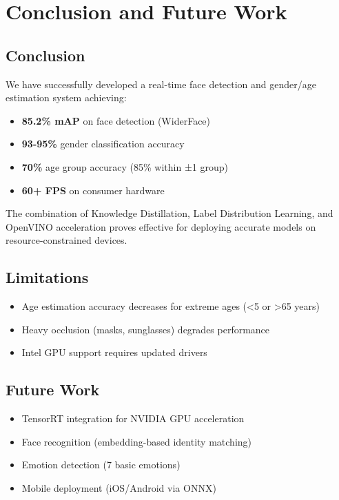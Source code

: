 \documentclass[12pt,a4paper]{article}
\begin{document}
\section{Conclusion and Future Work}

\subsection{Conclusion}

We have successfully developed a real-time face detection and gender/age estimation system achieving:

\begin{itemize}
    \item \textbf{85.2\% mAP} on face detection (WiderFace)
    \item \textbf{93-95\%} gender classification accuracy
    \item \textbf{70\%} age group accuracy (85\% within ±1 group)
    \item \textbf{60+ FPS} on consumer hardware
\end{itemize}

The combination of Knowledge Distillation, Label Distribution Learning, and OpenVINO acceleration proves effective for deploying accurate models on resource-constrained devices.

\subsection{Limitations}

\begin{itemize}
    \item Age estimation accuracy decreases for extreme ages (<5 or >65 years)
    \item Heavy occlusion (masks, sunglasses) degrades performance
    \item Intel GPU support requires updated drivers
\end{itemize}

\subsection{Future Work}

\begin{itemize}
    \item TensorRT integration for NVIDIA GPU acceleration
    \item Face recognition (embedding-based identity matching)
    \item Emotion detection (7 basic emotions)
    \item Mobile deployment (iOS/Android via ONNX)
\end{itemize}
\end{document}
